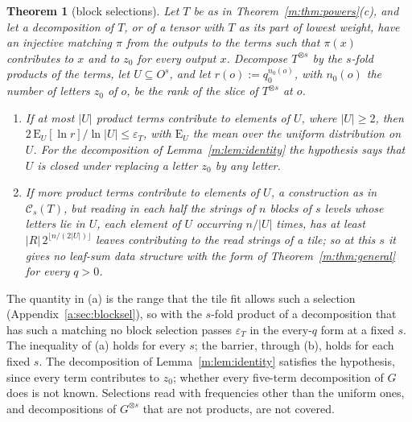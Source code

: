 \documentclass[11pt]{article}
\newtheorem{theorem}{Theorem}[section]
\theoremstyle{definition}
\theoremstyle{remark}
\begin{document}
\begin{theorem}[block selections]\label{m:thm:blocksel}
Let $T$ be as in Theorem~\ref{m:thm:powers}(c), and let a decomposition of $T$, or of a tensor with $T$ as its part of lowest weight, have an injective matching $\pi$ from the outputs to the terms such that $\pi(x)$ contributes to $x$ and to $z_0$ for every output $x$. Decompose $T^{\otimes s}$ by the $s$-fold products of the terms, let $U\subseteq O^s$, and let $r(o):=q_0^{n_0(o)}$, with $n_0(o)$ the number of letters $z_0$ of $o$, be the rank of the slice of $T^{\otimes s}$ at $o$.
\begin{enumerate}[label=(\alph*),nosep]
\item If at most $|U|$ product terms contribute to elements of $U$, where $|U|\ge2$, then $2\,\mathrm E_U[\ln r]/\ln|U|\le\varepsilon_T$, with $\mathrm E_U$ the mean over the uniform distribution on $U$. For the decomposition of Lemma~\ref{m:lem:identity} the hypothesis says that $U$ is closed under replacing a letter $z_0$ by any letter.
\item If more product terms contribute to elements of $U$, a construction as in $\mathcal C_s(T)$, but reading in each half the strings of $n$ blocks of $s$ levels whose letters lie in $U$, each element of $U$ occurring $n/|U|$ times, has at least $|R|\,2^{\lfloor n/(2|U|)\rfloor}$ leaves contributing to the read strings of a tile; so at this $s$ it gives no leaf-sum data structure with the form of Theorem~\ref{m:thm:general} for every $q>0$.
\end{enumerate}
\end{theorem}

The quantity in (a) is the range that the tile fit allows such a selection (Appendix~\ref{a:sec:blocksel}), so with the $s$-fold product of a decomposition that has such a matching no block selection passes $\varepsilon_T$ in the every-$q$ form at a fixed $s$. The inequality of (a) holds for every $s$; the barrier, through (b), holds for each fixed $s$. The decomposition of Lemma~\ref{m:lem:identity} satisfies the hypothesis, since every term contributes to $z_0$; whether every five-term decomposition of $G$ does is not known. Selections read with frequencies other than the uniform ones, and decompositions of $G^{\otimes s}$ that are not products, are not covered.
\end{document}
